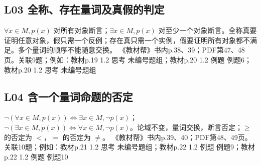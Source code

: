 \par\medskip\noindent\begin{minipage}{\linewidth}\subsection{L03 全称、存在量词及真假的判定}
$\forall x\in M,p(x)$ 对所有对象断言；$\exists x\in M,p(x)$ 对至少一个对象断言。全称真要证明任意对象，假只需一个反例；存在真只需一个实例，假要证明所有对象都不满足。多个量词的顺序不能随意交换。
{\small 《教材帮》书内p.38、39；PDF第47、48页。关联9题；例如：教材p.19 1.2 思考 未编号题组；教材p.20 1.2 例题 例题6；教材p.20 1.2 思考 未编号题组}\par\end{minipage}\par
\par\medskip\noindent\begin{minipage}{\linewidth}\subsection{L04 含一个量词命题的否定}
$\neg(\forall x\in M,p(x))\Leftrightarrow\exists x\in M,\neg p(x)$；$\neg(\exists x\in M,p(x))\Leftrightarrow\forall x\in M,\neg p(x)$。论域不变，量词交换，断言否定；$\ge$ 的否定为 $<$，$=$ 的否定为 $\ne$。
{\small 《教材帮》书内p.39、40；PDF第48、49页。关联10题；例如：教材p.21 1.2 思考 未编号题组；教材p.22 1.2 例题 例题9；教材p.22 1.2 例题 例题10}\par\end{minipage}\par
